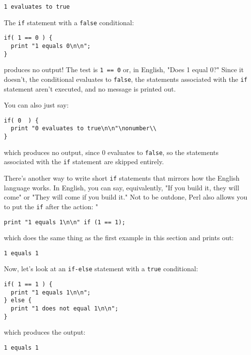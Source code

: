 \begin{lstlisting}
1 evaluates to true
\end{lstlisting}

The \verb|if| statement with a \verb|false| conditional: 

\begin{lstlisting}
if( 1 == 0 ) {
  print "1 equals 0\n\n";
}
\end{lstlisting}

produces no output! The test is \verb|1 == 0| or, in English, "Does 1 equal 0?" Since it doesn't, the conditional evaluates to \verb|false|, the statements associated with the \verb|if| statement aren't executed, and no message is printed out.

You can also just say:

\begin{lstlisting}
if( 0  ) {
  print "0 evaluates to true\n\n"\nonumber\\
}
\end{lstlisting}

which produces no output, since 0 evaluates to \verb|false|, so the statements associated with the \verb|if| statement are skipped entirely. 

There's another way to write short \verb|if| statements that mirrors how the English language works. In English, you can say, equivalently, "If you build it, they will come" or "They will come if you build it." Not to be outdone, Perl also allows you to put the \verb|if| after the action: " 

\begin{lstlisting}
print "1 equals 1\n\n" if (1 == 1);
\end{lstlisting}

which does the same thing as the first example in this section and prints out:

\begin{lstlisting}
1 equals 1
\end{lstlisting}

Now, let's look at an \verb|if-else| statement with a \verb|true| conditional:

\begin{lstlisting}
if( 1 == 1 ) {
  print "1 equals 1\n\n";
} else {
  print "1 does not equal 1\n\n";
}
\end{lstlisting}

which produces the output:

\begin{lstlisting}
1 equals 1
\end{lstlisting}

